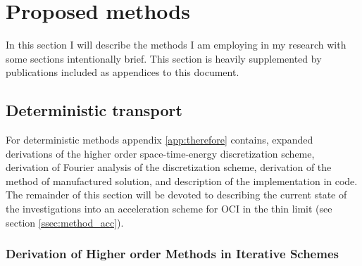 \chapter{Proposed methods}
\label{ch:methods}

In this section I will describe the methods I am employing in my research with some sections intentionally brief.
This section is heavily supplemented by publications included as appendices to this document.

\section{Deterministic transport}

For deterministic methods appendix \ref{app:therefore} contains, expanded derivations of the higher order space-time-energy discretization scheme, derivation of Fourier analysis of the discretization scheme, derivation of the method of manufactured solution, and description of the implementation in code.
The remainder of this section will be devoted to describing the current state of the investigations into an acceleration scheme for OCI in the thin limit (see section \ref{ssec:method_acc}).

\subsection{Derivation of Higher order Methods in Iterative Schemes}


